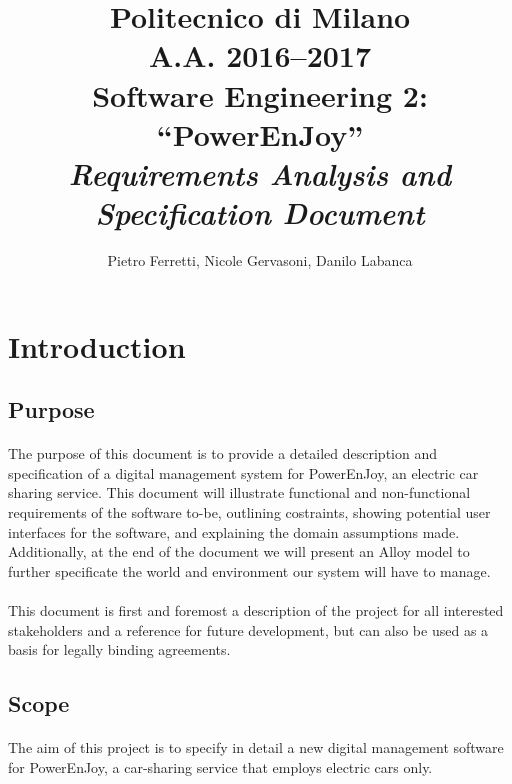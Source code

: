 \documentclass[english]{article}
\begin{document}
\title{Politecnico di Milano\\
 A.A. 2016–2017 \\
Software Engineering 2: “PowerEnJoy” \\
\emph{Requirements Analysis and Specification Document}}

\author{Pietro Ferretti, Nicole Gervasoni, Danilo Labanca}

\maketitle
\newpage{}

\tableofcontents{}

\newpage{}

\section{Introduction}

\subsection{Purpose}

\paragraph{}
The purpose of this document is to provide a detailed description and specification of a digital management system for PowerEnJoy, an electric car sharing service. This document will
illustrate functional and non-functional requirements of the software to-be, outlining costraints, showing potential user interfaces for the software, and explaining the domain assumptions made. Additionally, at the end of the document we will present an Alloy model to further specificate the world and environment our system will have to manage.

\paragraph{}
This document is first and foremost a description of the project for all interested stakeholders and a reference for future development, but can also be used as a basis for legally binding agreements.


\subsection{Scope}

\paragraph{}
The aim of this project is to specify in detail a new digital management software for PowerEnJoy, a car-sharing service that employs electric cars only.
\end{document}
